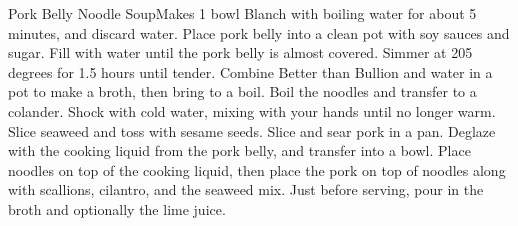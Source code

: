 \documentclass[]{article}
\title{}
\author{}
\begin{document}
\begin{recipe}{Pork Belly Noodle Soup}{}{Makes 1 bowl}
	Blanch with boiling water for about 5 minutes, and discard water. 
	Place pork belly into a clean pot with soy sauces and sugar. Fill with water until the pork belly is almost covered. Simmer at 205 degrees for 1.5 hours until tender. 
	Combine Better than Bullion and water in a pot to make a broth, then bring to a boil. 
	Boil the noodles and transfer to a colander. Shock with cold water, mixing with your hands until no longer warm.
	Slice seaweed and toss with sesame seeds.
	Slice and sear pork in a pan. Deglaze with the cooking liquid from the pork belly, and transfer into a bowl.
	Place noodles on top of the cooking liquid, then place the pork on top of noodles along with scallions, cilantro, and the seaweed mix. Just before serving, pour in the broth and optionally the lime juice. 
\end{recipe}
\end{document}
